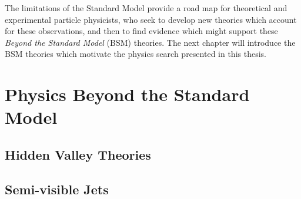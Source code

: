 The limitations of the Standard Model provide a road map for theoretical and experimental particle physicists, who seek to develop new theories which account for these observations, and then to find evidence which might support these \textit{Beyond the Standard Model} (BSM) theories. The next chapter will introduce the BSM theories which motivate the physics search presented in this thesis. 
  
\chapter{Physics Beyond the Standard Model}
\section{Hidden Valley Theories}
\section{Semi-visible Jets}